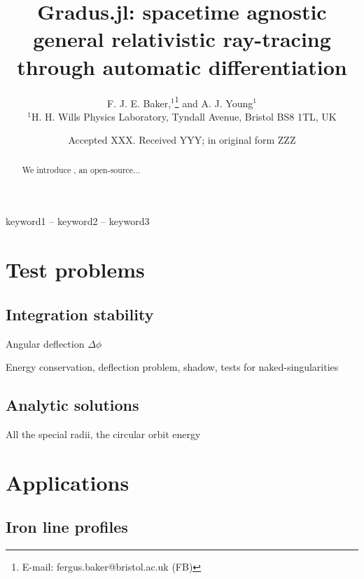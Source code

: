 \documentclass[fleqn,usenatbib]{mnras}
\title[Gradus.jl]{Gradus.jl: spacetime agnostic general relativistic ray-tracing through automatic differentiation}
\author[F. J. E. Baker et al.]{
F. J. E. Baker,$^{1}$\thanks{E-mail: fergus.baker@bristol.ac.uk (FB)}
and A. J. Young$^{1}$
\\
$^{1}$H. H. Wills Physics Laboratory, Tyndall Avenue, Bristol BS8 1TL, UK
}
\date{Accepted XXX. Received YYY; in original form ZZZ}
\begin{document}
\label{firstpage}
\pagerange{\pageref{firstpage}--\pageref{lastpage}}
\maketitle

\begin{abstract}
	We introduce \Gradus, an open-source...
\end{abstract}

\begin{keywords}
keyword1 -- keyword2 -- keyword3
\end{keywords}









\section{Test problems}

\subsection{Integration stability}

Angular deflection $\Delta \phi$

Energy conservation, deflection problem, shadow, tests for naked-singularities

\subsection{Analytic solutions}
All the special radii, the circular orbit energy

\section{Applications}

\subsection{Iron line profiles}
\end{document}
